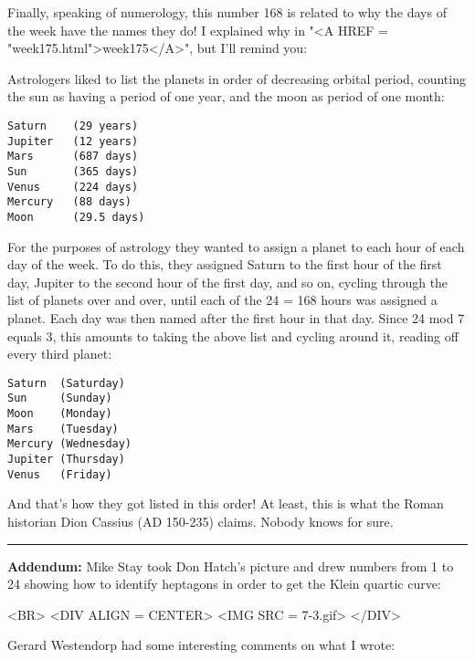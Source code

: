 Finally, speaking of numerology, this number 168 is related to why the 
days of the week have the names they do!  I explained why in "<A HREF = "week175.html">week175</A>", 
but I'll remind you:

Astrologers liked to list the planets in order of decreasing orbital 
period, counting the sun as having a period of one year, and the moon 
as period of one month:

\begin{verbatim}
Saturn    (29 years)  
Jupiter   (12 years) 
Mars      (687 days)  
Sun       (365 days)
Venus     (224 days)
Mercury   (88 days)
Moon      (29.5 days)
\end{verbatim}
    
For the purposes of astrology they wanted to assign a planet to each 
hour of each day of the week.  To do this, they assigned Saturn to 
the first hour of the first day, Jupiter to the second hour of the 
first day, and so on, cycling through the list of planets over and 
over, until each of the 24  = 168 hours was assigned a planet.  
Each day was then named after the first hour in that day.  Since 
24 mod 7 equals 3, this amounts to taking the above list and cycling
around it, reading off every third planet:
 
\begin{verbatim}
Saturn  (Saturday)  
Sun     (Sunday)   
Moon    (Monday)  
Mars    (Tuesday)  
Mercury (Wednesday)
Jupiter (Thursday)
Venus   (Friday)
\end{verbatim}
    

And that's how they got listed in this order!  At least, this is what 
the Roman historian Dion Cassius (AD 150-235) claims.  Nobody knows for
sure.


\par\noindent\rule{\textwidth}{0.4pt}

\textbf{Addendum:}
Mike Stay took Don Hatch's picture and drew numbers
from 1 to 24 showing how to identify heptagons in order 
to get the Klein quartic curve:

<BR>
<DIV ALIGN = CENTER>
<IMG SRC = 7-3.gif>
</DIV>

Gerard Westendorp had some interesting comments on what
I wrote:



